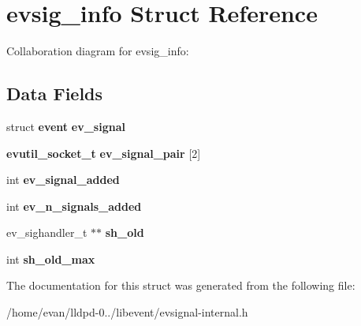 \section{evsig\-\_\-info \-Struct \-Reference}
\label{structevsig__info}


\-Collaboration diagram for evsig\-\_\-info\-:
\subsection*{\-Data \-Fields}
\begin{DoxyCompactItemize}
\item 
struct {\bf event} {\bfseries ev\-\_\-signal}\label{structevsig__info_aa77fe7bd272d4fc911958dd8bd4dcc81}

\item 
{\bf evutil\-\_\-socket\-\_\-t} {\bfseries ev\-\_\-signal\-\_\-pair} [2]\label{structevsig__info_acb92328a0e15f4ebe9e83d90f7f6c77b}

\item 
int {\bfseries ev\-\_\-signal\-\_\-added}\label{structevsig__info_a8cb9a292f6d79c5bfc6bf3c7a3635963}

\item 
int {\bfseries ev\-\_\-n\-\_\-signals\-\_\-added}\label{structevsig__info_ab3a419a02427cff1e519e8f56024c9b4}

\item 
ev\-\_\-sighandler\-\_\-t $\ast$$\ast$ {\bfseries sh\-\_\-old}\label{structevsig__info_a5027d4fcdc2b6a1ad3e4d5edcc4f3bac}

\item 
int {\bfseries sh\-\_\-old\-\_\-max}\label{structevsig__info_acf44d00198ec2e19d235ca6f40dbbf3e}

\end{DoxyCompactItemize}


\-The documentation for this struct was generated from the following file\-:\begin{DoxyCompactItemize}
\item 
/home/evan/lldpd-\/0../libevent/evsignal-\/internal.\-h\end{DoxyCompactItemize}
